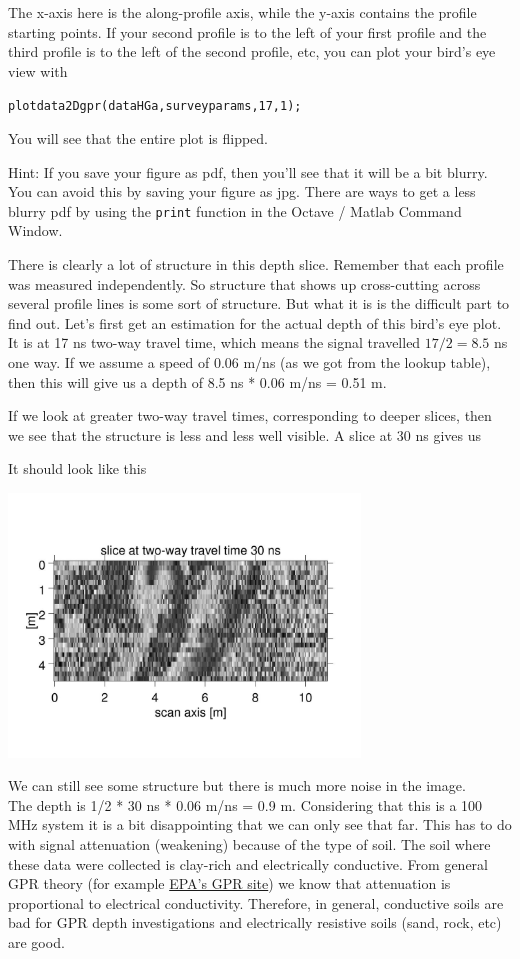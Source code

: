 \documentclass[11pt]{article}
\begin{document}
The x-axis here is the along-profile axis, while the y-axis contains
the profile starting points. If your second profile is to the left of
your first profile and the third profile is to the left of the second
profile, etc, you can plot your bird's eye view with

\qquad \verb#plotdata2Dgpr(dataHGa,surveyparams,17,1);#

You will see that the entire plot is flipped.

Hint: If you save your figure as pdf, then you'll see that it will be
a bit blurry. You can avoid this by saving your figure as jpg. There
are ways to get a less blurry pdf by using the \verb#print# function
in the Octave / Matlab Command Window.

There is clearly a lot of structure in this depth slice. Remember that
each profile was measured independently. So structure that shows up
cross-cutting across several profile lines is some sort of
structure. But what it is is the difficult part to find out. Let's
first get an estimation for the actual depth of this bird's eye
plot. It is at 17 ns two-way travel time, which means the signal
travelled $17/2=8.5$ ns one way. If we assume a speed of 0.06 m/ns (as
we got from the lookup table), then this will give us a depth of 8.5
ns * 0.06 m/ns = 0.51 m.

If we look at greater two-way travel times, corresponding to deeper
slices, then we see that the structure is less and less well
visible. A slice at 30 ns gives us

It should look like this
\begin{center}
\includegraphics[width=0.7\textwidth, trim = 1cm 3cm 1cm
  3cm,clip]{figures/Area30ns.jpg}
\end{center}

We can still see some structure but there is much more noise in the
image.  \\The depth is 1/2 * 30 ns * 0.06 m/ns = 0.9 m.  Considering
that this is a 100 MHz system it is a bit disappointing that we can
only see that far. This has to do with signal attenuation (weakening)
because of the type of soil.  The soil where these data were collected
is clay-rich and electrically conductive.  From general GPR theory
(for example
\href{https://archive.epa.gov/esd/archive-geophysics/web/html/ground-penetrating_radar.html}{EPA's
  GPR site}) we know that attenuation is proportional to electrical
conductivity. Therefore, in general, conductive soils are bad for GPR
depth investigations and electrically resistive soils (sand, rock,
etc) are good.
\end{document}

